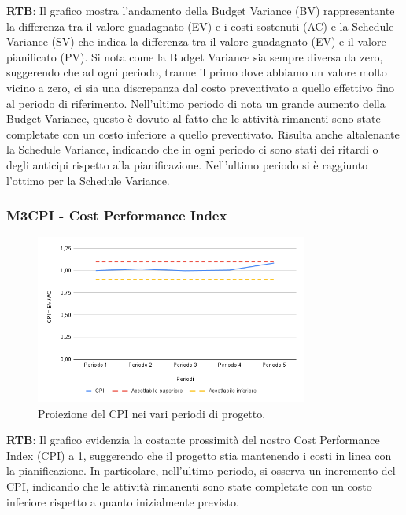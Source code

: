 \textbf{RTB}: Il grafico mostra l'andamento della Budget Variance (BV) rappresentante la differenza tra il valore guadagnato (EV) e i costi sostenuti (AC) e la Schedule Variance (SV) che indica la differenza tra il valore guadagnato (EV) e il valore pianificato (PV). Si nota come la Budget Variance sia sempre diversa da zero, suggerendo che ad ogni periodo, tranne il primo dove abbiamo un valore molto vicino a zero, ci sia una discrepanza dal costo preventivato a quello effettivo fino al periodo di riferimento. Nell'ultimo periodo di nota un grande aumento della Budget Variance, questo è dovuto al fatto che le attività rimanenti sono state completate con un costo inferiore a quello preventivato. 
Risulta anche altalenante la Schedule Variance, indicando che in ogni periodo ci sono stati dei ritardi o degli anticipi rispetto alla pianificazione. Nell'ultimo periodo si è raggiunto l'ottimo per la Schedule Variance. 

\subsubsection{M3CPI - Cost Performance Index}
\begin{figure}[H]
    \centering
    \includegraphics[width=0.8\textwidth]{../Images/PianoDiQualifica/M3CPI.png}
    \caption{Proiezione del CPI nei vari periodi di progetto.}
    \label{fig:6}
\end{figure}

\textbf{RTB}: Il grafico evidenzia la costante prossimità del nostro Cost Performance Index (CPI) a 1, suggerendo che il progetto stia mantenendo i costi in linea con la pianificazione. In particolare, nell'ultimo periodo, si osserva un incremento del CPI, indicando che le attività rimanenti sono state completate con un costo inferiore rispetto a quanto inizialmente previsto.


